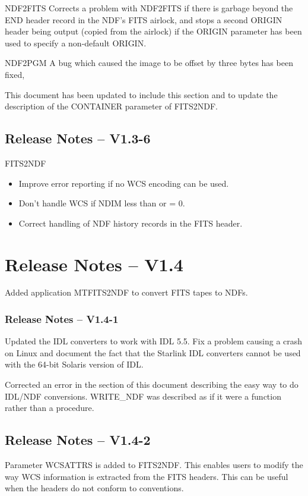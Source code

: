 \documentclass[twoside,11pt]{article}
\newcommand{\htmlref}[2]{#1}
\begin{document}
\htmlref{NDF2FITS}{NDF2FITS}
Corrects a problem with NDF2FITS if there is garbage beyond the END header
record in the NDF's FITS airlock, and stops a second ORIGIN header being
output (copied from the airlock) if the ORIGIN parameter has been used to
specify a non-default ORIGIN.

\htmlref{NDF2PGM}{NDF2PGM}
A bug which caused the image to be offset by three bytes has been fixed,

This document has been updated to include this section and to update the
description of the CONTAINER parameter of
\htmlref{FITS2NDF}{FITS2NDF}.

\subsection{Release Notes -- V1.3-6}
\htmlref{FITS2NDF}{FITS2NDF}
\begin{itemize}
\item Improve error reporting if no WCS encoding can be used.

\item Don't handle WCS if NDIM less than or = 0.

\item Correct handling of NDF history records in the FITS header.
\end{itemize}

\section{Release Notes -- V1.4}
Added application \htmlref{MTFITS2NDF}{MTFITS2NDF} to convert FITS tapes to NDFs.

\subsubsection{Release Notes -- V1.4-1}
Updated the IDL converters to work with IDL 5.5. Fix a problem causing a crash
on Linux and document the fact that the Starlink IDL converters cannot be used
with the 64-bit Solaris version of IDL.

Corrected an error in the section of this document describing the easy
way to do IDL/NDF conversions.  \htmlref{WRITE\_NDF}{WRITE_NDF} was
described as if it were a function rather than a procedure.

\subsection{Release Notes -- V1.4-2}
Parameter WCSATTRS is added to \htmlref{FITS2NDF}{FITS2NDF}.
This enables users to modify the way WCS information is extracted from the
FITS headers. This can be useful when the headers do not conform to conventions. 
\end{document}
